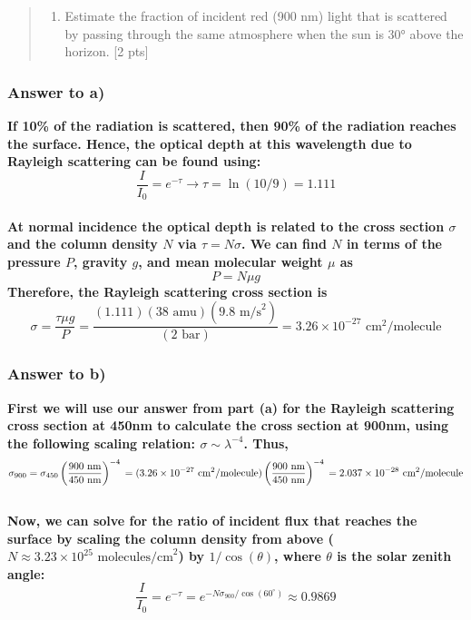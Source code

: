 \documentclass[11pt]{article}
\providecommand{\tightlist}{%
      \setlength{\itemsep}{0pt}\setlength{\parskip}{0pt}}
\begin{document}
\begin{quote}
\begin{enumerate}
\def\labelenumi{(\alph{enumi})}
\setcounter{enumi}{1}
\tightlist
\item
  Estimate the fraction of incident red (900 nm) light that is scattered
  by passing through the same atmosphere when the sun is 30° above the
  horizon. {[}2 pts{]}
\end{enumerate}
\end{quote}

    \subsubsection{Answer to a)}\label{answer-to-a}

\textbf{If 10\% of the radiation is scattered, then 90\% of the
radiation reaches the surface. Hence, the optical depth at this
wavelength due to Rayleigh scattering can be found using:\\
\[ \frac{I}{I_0} = e^{-\tau} \rightarrow \tau = \ln(10/9) = 1.111 \]\\
At normal incidence the optical depth is related to the cross section
\(\sigma\) and the column density \(N\) via \(\tau = N \sigma\). We can
find \(N\) in terms of the pressure \(P\), gravity \(g\), and mean
molecular weight \(\mu\) as \[ P = N \mu g \] Therefore, the Rayleigh
scattering cross section is\\
\[ \sigma = \frac{\tau \mu g}{P} = \frac{(1.111)(38 \text{ amu})(9.8 \text{ m/s}^2)}{(2 \text{ bar})} = 3.26 \times 10^{-27} \text{ cm}^2 \text{/molecule}\]
}

\subsubsection{Answer to b)}\label{answer-to-b}

\textbf{First we will use our answer from part (a) for the Rayleigh
scattering cross section at 450nm to calculate the cross section at
900nm, using the following scaling relation:
\(\sigma \sim \lambda^{-4}\). Thus,
\[ \sigma_{900} = \sigma_{450} \left ( \frac{900 \text{ nm}}{450 \text{ nm}} \right )^{-4} \\ = ( 3.26 \times 10^{-27} \text{ cm}^2 \text{/molecule} ) \left ( \frac{900 \text{ nm}}{450 \text{ nm}} \right )^{-4} \\ = 2.037 \times 10^{-28} \text{ cm}^2 \text{/molecule}\]\\
Now, we can solve for the ratio of incident flux that reaches the
surface by scaling the column density from above
(\(N \approx 3.23 \times 10^{25} \text{ molecules/cm}^{2}\)) by
\(1/\cos(\theta)\), where \(\theta\) is the solar zenith angle:\\
\[ \frac{I}{I_0} = e^{-\tau} = e^{-N \sigma_{900} / \cos(60^{\circ})} \approx 0.9869\]}
\end{document}
